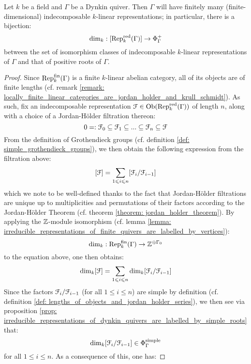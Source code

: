             \begin{theorem} \label{theorem: gabriel_theorem_dynkin_implies_representation_finite}
                Let $k$ be a field and $\Gamma$ be a Dynkin quiver. Then $\Gamma$ will have finitely many (finite-dimensional) indecomposable $k$-linear representations; in particular, there is a bijection:
                    $$\dim_k: [\mathrm{Rep}_k^{\mathrm{red}}(\Gamma)] \to \Phi_{\Gamma}^+$$
                between the set of isomorphism classes of indecomposable $k$-linear representations of $\Gamma$ and that of positive roots of $\Gamma$.
            \end{theorem}
                \begin{proof}
                    Since $\mathrm{Rep}_k^{\mathrm{fin}}(\Gamma)$ is a finite $k$-linear abelian category, all of its objects are of finite lengths (cf. remark \ref{remark: locally_finite_linear_categories_are_jordan_holder_and_krull_schmidt}). As such, fix an indecomposable representation $\mathcal{F} \in \mathrm{Ob}(\mathrm{Rep}_k^{\mathrm{red}}(\Gamma))$ of length $n$, along with a choice of a Jordan-H\"older filtration thereon:
                        $$0 =: \mathcal{F}_0 \subseteq \mathcal{F}_1 \subseteq ... \subseteq \mathcal{F}_n \subseteq \mathcal{F}$$
                    From the definition of Grothendieck groups (cf. definition \ref{def: simple_grothendieck_groups}), we then obtain the following expression from the filtration above:
                        $$[\mathcal{F}] = \sum_{1 \leqslant i \leqslant n} [\mathcal{F}_i/\mathcal{F}_{i - 1}]$$
                    which we note to be well-defined thanks to the fact that Jordan-H\"older filtrations are unique up to multiplicities and permutations of their factors according to the Jordan-H\"older Theorem (cf. theorem \ref{theorem: jordan_holder_theorem}). By applying the $\mathbb{Z}$-module isomorphism (cf. lemma \ref{lemma: irreducible_representations_of_finite_quivers_are_labelled_by_vertices}):
                        $$\dim_k: \mathrm{Rep}_k^{\mathrm{fin}}(\Gamma) \to \mathbb{Z}^{\oplus \Gamma_0}$$
                    to the equation above, one then obtains:
                        $$\dim_k [\mathcal{F}] = \sum_{1 \leqslant i \leqslant n} \dim_k [\mathcal{F}_i/\mathcal{F}_{i - 1}]$$
                    Since the factors $\mathcal{F}_i/\mathcal{F}_{i - 1}$ (for all $1 \leq i \leq n$) are simple by definition (cf. definition \ref{def: lengths_of_objects_and_jordan_holder_series}), we then see via proposition \ref{prop: irreducible_representations_of_dynkin_quivers_are_labelled_by_simple_roots} that:
                        $$\dim_k [\mathcal{F}_i/\mathcal{F}_{i - 1}] \in \Phi_{\Gamma}^{\mathrm{simple}}$$
                    for all $1 \leq i \leq n$. As a consequence of this, one has:

\end{proof}
